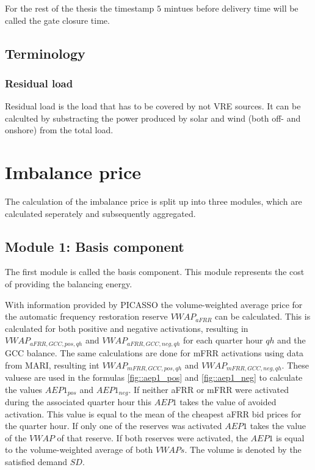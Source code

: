 \documentclass[class=scrbook, crop=false]{standalone}
\begin{document}
For the rest of the thesis the timestamp $5$ mintues before delivery time will be called the gate closure time.

\subsection{Terminology}

\subsubsection{Residual load}

Residual load is the load  that has to be covered by not VRE sources.
It can be calculted by substracting the power produced by solar and wind (both off- and onshore) from the total load.

\section{Imbalance price}
\label{Section::Imbalance_Price}
The calculation of the imbalance price is split up into three modules, which are calculated seperately and subsequently aggregated.

\subsection{Module 1: Basis component}
The first module is called the basis component. 
This module represents the cost of providing the balancing energy.

With information provided by PICASSO the volume-weighted average price for the automatic frequency restoration reserve $VWAP_{aFRR}$ can be calculated. This is calculated for both positive and negative activations, resulting in $VWAP_{aFRR, GCC, pos, qh}$ and $VWAP_{aFRR,  GCC, neg, qh}$ for each quarter hour $qh$ and the GCC balance.
The same calculations are done for mFRR activations using data from MARI, resulting int $VWAP_{mFRR, GCC, pos, qh}$ and $VWAP_{mFRR, GCC, neg, qh}$. 
These valuese are used in the formulas \ref{fig::aep1_pos} and \ref{fig::aep1_neg} to calculate the values $AEP1_{pos}$ and $AEP1_{neg}$. 
If neither aFRR or mFRR were activated during the associated quarter hour this $AEP1$ takes the value of avoided activation. This value is equal to the mean of the cheapest aFRR bid prices for the quarter hour.
If only one of the reserves was activated $AEP1$ takes the value of the $VWAP$ of that reserve. 
If both reserves were activated, the $AEP1$ is equal to the volume-weighted average of both $VWAPs$. The volume is denoted by the satisfied demand $SD$.
\end{document}
